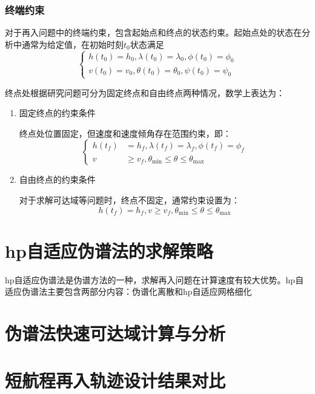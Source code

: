 \subsubsection{终端约束}
对于再入问题中的终端约束，包含起始点和终点的状态约束。起始点处的状态在分析中通常为给定值，在初始时刻$ t_0 $状态满足
\begin{equation}
	\left\{ \begin{aligned}
		h(t_0)=h_0,\lambda(t_0)=\lambda_0,\phi(t_0)=\phi_0 \\
		v(t_0)=v_0,\theta(t_0)=\theta_0,\psi(t_0)=\psi_0
	\end{aligned} \right.
\end{equation}

终点处根据研究问题可分为固定终点和自由终点两种情况，数学上表达为：
\begin{enumerate}
	\item 固定终点的约束条件\par
	      终点处位置固定，但速度和速度倾角存在范围约束，即：
	      \begin{equation}
		      \left\{ \begin{aligned}
				  h(t_f)&=h_{f}, \lambda(t_f)=\lambda_{f}, \phi(t_f)=\phi_{f} \\
				  v &\geq v_{f}, \theta_{\min } \leq \theta \leq \theta_{\max }
		      \end{aligned}\right.
	      \end{equation}
	\item 自由终点的约束条件\par
	对于求解可达域等问题时，终点不固定，通常约束设置为：
	\begin{equation}
		h(t_f)=h_{f}, v \geq v_{f}, \theta_{\min } \leq \theta \leq \theta_{\max }
	\end{equation}
\end{enumerate}

\section{hp自适应伪谱法的求解策略}
hp自适应伪谱法是伪谱方法的一种，求解再入问题在计算速度有较大优势。hp自适应伪谱法主要包含两部分内容：伪谱化离散和hp自适应网格细化


\section{伪谱法快速可达域计算与分析}
\section{短航程再入轨迹设计结果对比}

\subsection{}